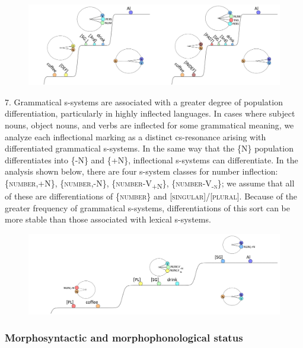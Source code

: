   
\begin{figure}
\includegraphics[width=\textwidth]{figures/Tilsen-img66.png}
\caption{\missingcaption}
\label{fig:}
\end{figure}
 

7. Grammatical s-systems are associated with a greater degree of population differentiation, particularly in highly inflected languages. In cases where subject nouns, object nouns, and verbs are inflected for some grammatical meaning, we analyze each inflectional marking as a distinct cs-resonance arising with differentiated grammatical s-systems. In the same way that the \{N\} population differentiates into \{-N\} and \{+N\}, inflectional s-systems can differentiate. In the analysis shown below, there are four s-system classes for number inflection: \{\textsc{number},+N\}, \{\textsc{number},-N\}, \{\textsc{number}{}-\textsc{V}\textsc{\textsubscript{+N}}\textsc{\}}, \{\textsc{number}{}-\textsc{V}\textsc{\textsubscript{{}-n}}\textsc{\};} we assume that all of these are differentiations of \{\textsc{number}\} and [\textsc{singular}]/[\textsc{plural}]. Because of the greater frequency of grammatical s-systems, differentiations of this sort can be more stable than those associated with lexical s-systems. 

  
\begin{figure}
\includegraphics[width=\textwidth]{figures/Tilsen-img67.png}
\caption{\missingcaption}
\label{fig:}
\end{figure}
 

\subsubsection{Morphosyntactic and morphophonological status}

